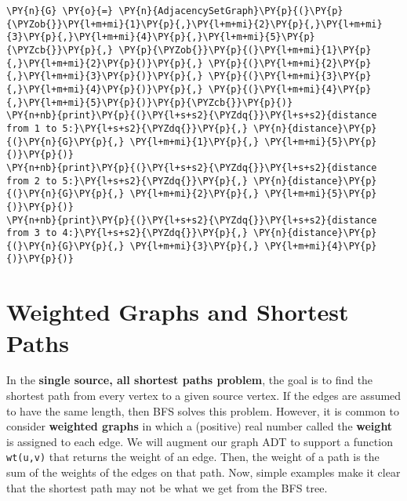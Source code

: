 \begin{Verbatim}[commandchars=\\\{\}]
\PY{n}{G} \PY{o}{=} \PY{n}{AdjacencySetGraph}\PY{p}{(}\PY{p}{\PYZob{}}\PY{l+m+mi}{1}\PY{p}{,}\PY{l+m+mi}{2}\PY{p}{,}\PY{l+m+mi}{3}\PY{p}{,}\PY{l+m+mi}{4}\PY{p}{,}\PY{l+m+mi}{5}\PY{p}{\PYZcb{}}\PY{p}{,} \PY{p}{\PYZob{}}\PY{p}{(}\PY{l+m+mi}{1}\PY{p}{,}\PY{l+m+mi}{2}\PY{p}{)}\PY{p}{,} \PY{p}{(}\PY{l+m+mi}{2}\PY{p}{,}\PY{l+m+mi}{3}\PY{p}{)}\PY{p}{,} \PY{p}{(}\PY{l+m+mi}{3}\PY{p}{,}\PY{l+m+mi}{4}\PY{p}{)}\PY{p}{,} \PY{p}{(}\PY{l+m+mi}{4}\PY{p}{,}\PY{l+m+mi}{5}\PY{p}{)}\PY{p}{\PYZcb{}}\PY{p}{)}
\PY{n+nb}{print}\PY{p}{(}\PY{l+s+s2}{\PYZdq{}}\PY{l+s+s2}{distance from 1 to 5:}\PY{l+s+s2}{\PYZdq{}}\PY{p}{,} \PY{n}{distance}\PY{p}{(}\PY{n}{G}\PY{p}{,} \PY{l+m+mi}{1}\PY{p}{,} \PY{l+m+mi}{5}\PY{p}{)}\PY{p}{)}
\PY{n+nb}{print}\PY{p}{(}\PY{l+s+s2}{\PYZdq{}}\PY{l+s+s2}{distance from 2 to 5:}\PY{l+s+s2}{\PYZdq{}}\PY{p}{,} \PY{n}{distance}\PY{p}{(}\PY{n}{G}\PY{p}{,} \PY{l+m+mi}{2}\PY{p}{,} \PY{l+m+mi}{5}\PY{p}{)}\PY{p}{)}
\PY{n+nb}{print}\PY{p}{(}\PY{l+s+s2}{\PYZdq{}}\PY{l+s+s2}{distance from 3 to 4:}\PY{l+s+s2}{\PYZdq{}}\PY{p}{,} \PY{n}{distance}\PY{p}{(}\PY{n}{G}\PY{p}{,} \PY{l+m+mi}{3}\PY{p}{,} \PY{l+m+mi}{4}\PY{p}{)}\PY{p}{)}
\end{Verbatim}


\section{Weighted Graphs and Shortest Paths}


In the \textbf{single source, all shortest paths problem}, the goal is to find the shortest path from every vertex to a given source vertex.
If the edges are assumed to have the same length, then BFS solves this problem.
However, it is common to consider \textbf{weighted graphs} in which a (positive) real number called the \textbf{weight} is assigned to each edge.
We will augment our graph ADT to support a function \texttt{wt(u,v)} that returns the weight of an edge.
Then, the weight of a path is the sum of the weights of the edges on that path.
Now, simple examples make it clear that the shortest path may not be what we get from the BFS tree.

